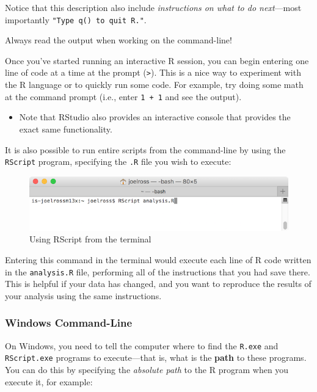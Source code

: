\documentclass[]{book}
\providecommand{\tightlist}{%
  \setlength{\itemsep}{0pt}\setlength{\parskip}{0pt}}
\theoremstyle{definition}
\theoremstyle{definition}
\theoremstyle{remark}
\begin{document}
Notice that this description also include \emph{instructions on what to
do next}---most importantly
\texttt{"Type\ \textquotesingle{}q()\textquotesingle{}\ to\ quit\ R."}.

Always read the output when working on the command-line!

Once you've started running an interactive R session, you can begin
entering one line of code at a time at the prompt
(\texttt{\textgreater{}}). This is a nice way to experiment with the R
language or to quickly run some code. For example, try doing some math
at the command prompt (i.e., enter \texttt{1\ +\ 1} and see the output).

\begin{itemize}
\tightlist
\item
  Note that RStudio also provides an interactive console that provides
  the exact same functionality.
\end{itemize}

It is also possible to run entire scripts from the command-line by using
the \texttt{RScript} program, specifying the \texttt{.R} file you wish
to execute:

\begin{figure}
\centering
\includegraphics{img/r-intro/rscript-terminal.png}
\caption{Using RScript from the terminal}
\end{figure}

Entering this command in the terminal would execute each line of R code
written in the \texttt{analysis.R} file, performing all of the
instructions that you had save there. This is helpful if your data has
changed, and you want to reproduce the results of your analysis using
the same instructions.

\subsubsection{Windows Command-Line}\label{windows-command-line}

On Windows, you need to tell the computer where to find the
\texttt{R.exe} and \texttt{RScript.exe} programs to execute---that is,
what is the \textbf{path} to these programs. You can do this by
specifying the \emph{absolute path} to the R program when you execute
it, for example:
\end{document}
